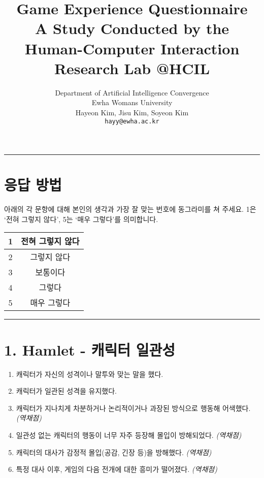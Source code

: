 \documentclass[12pt]{article}
\title{\textbf{Game Experience Questionnaire}\\[0.5em]
\large A Study Conducted by the Human-Computer Interaction Research Lab @HCIL}
\author{Department of Artificial Intelligence Convergence\\
Ewha Womans University\\
Hayeon Kim, Jisu Kim, Soyeon Kim\\
\texttt{hayy@ewha.ac.kr}}
\begin{document}
\maketitle
\hrule
\vspace{0.5cm}

\section*{응답 방법}
아래의 각 문항에 대해 본인의 생각과 가장 잘 맞는 번호에 동그라미를 쳐 주세요.  
1은 ‘전혀 그렇지 않다’, 5는 ‘매우 그렇다’를 의미합니다.

\vspace{0.5cm}

\begin{center}
\begin{tabular}{|c|c|}
\hline
1 & 전혀 그렇지 않다 \\
\hline
2 & 그렇지 않다 \\
\hline
3 & 보통이다 \\
\hline
4 & 그렇다 \\
\hline
5 & 매우 그렇다 \\
\hline
\end{tabular}
\end{center}

\vspace{0.5cm}
\hrule
\vspace{0.5cm}

\section*{1. Hamlet - 캐릭터 일관성}

\begin{enumerate}[label=\arabic*.]
    \item 캐릭터가 자신의 성격이나 말투와 맞는 말을 했다.
    \item 캐릭터가 일관된 성격을 유지했다.
    \item 캐릭터가 지나치게 차분하거나 논리적이거나 과장된 방식으로 행동해 어색했다. \textit{(역채점)}
    \item 일관성 없는 캐릭터의 행동이 너무 자주 등장해 몰입이 방해되었다. \textit{(역채점)}
    \item 캐릭터의 대사가 감정적 몰입(공감, 긴장 등)을 방해했다. \textit{(역채점)}
    \item 특정 대사 이후, 게임의 다음 전개에 대한 흥미가 떨어졌다. \textit{(역채점)}
\end{enumerate}
\end{document}

